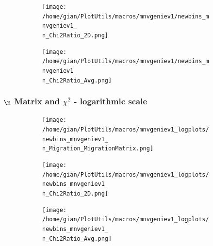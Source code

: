\documentclass[graphics]{beamer}
\begin{document}
{\begin{frame}
\begin{figure}
	\begin{subfigure}{.5\textwidth}
	\texttt{[image: /home/gian/PlotUtils/macros/mnvgeniev1/newbins\_mnvgeniev1\_\\n\_Chi2Ratio\_2D.png]}
	\end{subfigure}%
	\begin{subfigure}{.5\textwidth}
	\texttt{[image: /home/gian/PlotUtils/macros/mnvgeniev1/newbins\_mnvgeniev1\_\\n\_Chi2Ratio\_Avg.png]}
	\end{subfigure}
\end{figure}
\end{frame}
\begin{frame}
	\frametitle{ $\n$ Matrix and $\chi^{2}$ - logarithmic scale}
\vspace{0.25in}	
\begin{figure}

	\begin{subfigure}{.5\textwidth}
	\texttt{[image: /home/gian/PlotUtils/macros/mnvgeniev1\_logplots/newbins\_mnvgeniev1\_\\n\_Migration\_MigrationMatrix.png]}
	\end{subfigure}
\end{figure}
\begin{figure}

	\begin{subfigure}{.5\textwidth}
	\texttt{[image: /home/gian/PlotUtils/macros/mnvgeniev1\_logplots/newbins\_mnvgeniev1\_\\n\_Chi2Ratio\_2D.png]}
	\end{subfigure}%
	\begin{subfigure}{.5\textwidth}
	\texttt{[image: /home/gian/PlotUtils/macros/mnvgeniev1\_logplots/newbins\_mnvgeniev1\_\\n\_Chi2Ratio\_Avg.png]}
	\end{subfigure}
\end{figure}
\end{frame}
}
\end{document}

